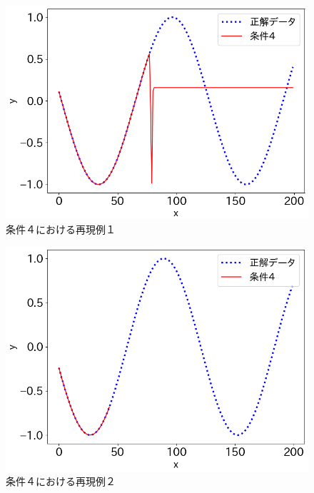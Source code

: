 \begin{figure}[hp]
  \begin{center}
    \includegraphics[width=12cm]{./fig/append7}
    \caption{条件４における再現例１}
    \label{fig:append7}
  \end{center}
\end{figure}

\begin{figure}[htp]
  \begin{center}
    \includegraphics[width=12cm]{./fig/append8}
    \caption{条件４における再現例２}
    \label{fig:append8}
  \end{center}
\end{figure}

